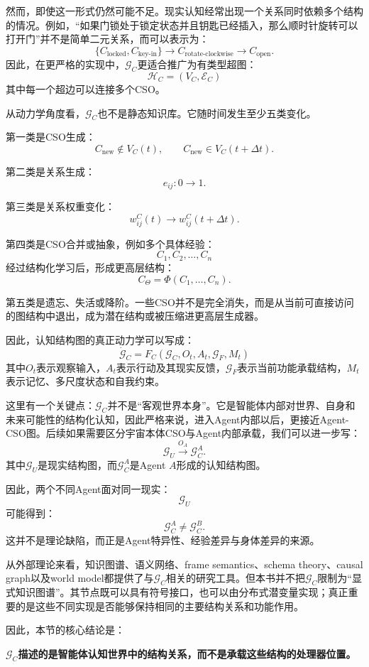然而，即使这一形式仍然可能不足。现实认知经常出现一个关系同时依赖多个结构的情况。例如，“如果门锁处于锁定状态并且钥匙已经插入，那么顺时针旋转可以打开门”并不是简单二元关系，而可以表示为：
\[
\{C_{\text{locked}},C_{\text{key-in}}\}
\rightarrow
C_{\text{rotate-clockwise}}
\rightarrow
C_{\text{open}}.
\]
因此，在更严格的实现中，$\mathcal G_C$更适合推广为有类型超图：
\[
\boxed{
\mathcal H_C
=
(V_C,\mathcal E_C)
}
\]
其中每一个超边可以连接多个CSO。

从动力学角度看，$\mathcal G_C$也不是静态知识库。它随时间发生至少五类变化。

第一类是CSO生成：
\[
C_{\text{new}}\notin V_C(t),
\qquad
C_{\text{new}}\in V_C(t+\Delta t).
\]

第二类是关系生成：
\[
e_{ij}:0\rightarrow1.
\]

第三类是关系权重变化：
\[
w_{ij}^C(t)
\rightarrow
w_{ij}^C(t+\Delta t).
\]

第四类是CSO合并或抽象，例如多个具体经验：
\[
C_1,C_2,\ldots,C_n
\]
经过结构化学习后，形成更高层结构：
\[
C_\Theta
=
\Phi(C_1,\ldots,C_n).
\]

第五类是遗忘、失活或降阶。一些CSO并不是完全消失，而是从当前可直接访问的图结构中退出，成为潜在结构或被压缩进更高层生成器。

因此，认知结构图的真正动力学可以写成：
\[
\boxed{
\dot{\mathcal G}_C
=
F_C
\left(
\mathcal G_C,
O_t,
A_t,
\mathcal G_F,
M_t
\right)
}
\]
其中$O_t$表示观察输入，$A_t$表示行动及其现实反馈，$\mathcal G_F$表示当前功能承载结构，$M_t$表示记忆、多尺度状态和自我约束。

这里有一个关键点：$\mathcal G_C$并不是“客观世界本身”。它是智能体内部对世界、自身和未来可能性的结构化认知，因此严格来说，进入Agent内部以后，更接近Agent-CSO图。后续如果需要区分宇宙本体CSO与Agent内部承载，我们可以进一步写：
\[
\mathcal G_U
\xrightarrow{O_A}
\mathcal G_C^A.
\]
其中$\mathcal G_U$是现实结构图，而$\mathcal G_C^A$是Agent $A$形成的认知结构图。

因此，两个不同Agent面对同一现实：
\[
\mathcal G_U
\]
可能得到：
\[
\mathcal G_C^A
\neq
\mathcal G_C^B.
\]
这并不是理论缺陷，而正是Agent特异性、经验差异与身体差异的来源。

从外部理论来看，知识图谱、语义网络、frame semantics、schema theory、causal graph以及world model都提供了与$\mathcal G_C$相关的研究工具。但本书并不把$\mathcal G_C$限制为“显式知识图谱”。其节点既可以具有符号接口，也可以由分布式潜变量实现；真正重要的是这些不同实现是否能够保持相同的主要结构关系和功能作用。

因此，本节的核心结论是：
\begin{conclusion}
\bfseries
$\mathcal G_C$描述的是智能体认知世界中的结构关系，而不是承载这些结构的处理器位置。
\end{conclusion}

